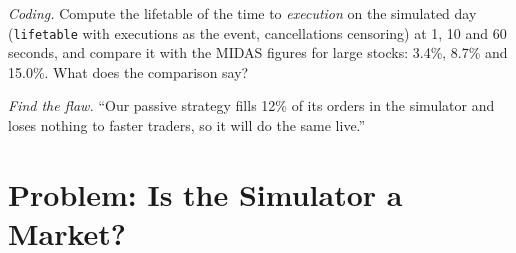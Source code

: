 \begin{exercise}[$\star\star\star$]\label{exo:mx:empirical-facts-of-order-books:7}
\emph{Coding.} Compute the lifetable of the time to \emph{execution} on the simulated day (\texttt{lifetable} with executions as the event, cancellations
censoring) at 1, 10 and 60 seconds, and compare it with the MIDAS figures for large stocks: 3.4\%, 8.7\% and 15.0\%. What does the comparison say?
\end{exercise}

\begin{exercise}[$\star\star\star$]\label{exo:mx:empirical-facts-of-order-books:8}
\emph{Find the flaw.} ``Our passive strategy fills 12\% of its orders in the simulator and loses nothing to faster traders, so it will do the same live.''
\end{exercise}

\section{Problem: Is the Simulator a Market?}

